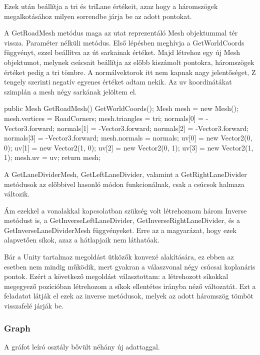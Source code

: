 Ezek után beállítja a tri és triLane értékeit, azaz hogy a háromszögek megalkotásához milyen sorrendbe járja be az adott pontokat.


A GetRoadMesh metódus maga az utat reprezentáló Mesh objektummal tér vissza. Paraméter nélküli metódus. Első lépésben meghívja a GetWorldCoords függvényt, ezzel beállítva az út sarkainak értéket. Majd létrehoz egy új Mesh objektumot, melynek csúcsait beállítja az előbb kiszámolt pontokra, háromszögek értéket pedig a tri tömbre. A normálvektorok itt nem kapnak nagy jelentőséget, Z tengely szerinti negatív egyenes értéket adtam nekik. Az uv koordinátákat szimplán a mesh négy sarkának jelöltem el.
\begin{cpp}
public Mesh GetRoadMesh()
        {
            GetWorldCoords();
            Mesh mesh = new Mesh();
            mesh.vertices = RoadCorners;
            mesh.triangles = tri;
            normals[0] = -Vector3.forward;
            normals[1] = -Vector3.forward;
            normals[2] = -Vector3.forward;
            normals[3] = -Vector3.forward;
            mesh.normals = normals;
            uv[0] = new Vector2(0, 0);
            uv[1] = new Vector2(1, 0);
            uv[2] = new Vector2(0, 1);
            uv[3] = new Vector2(1, 1);
            mesh.uv = uv;
            return mesh;
        }
\end{cpp}
A GetLaneDividerMesh, GetLeftLaneDivider, valamint a GetRightLaneDivider metódusok az előbbivel hasonló módon funkcionálnak, csak a csúcsok halmaza változik.

Ám ezekkel a vonalakkal kapcsolatban szükség volt létrehoznom három Inverse metódust is, a GetInverseLeftLaneDivider, GetInverseRightLaneDivider, és a GetInverseLaneDividerMesh függvényeket. Erre az a magyarázat, hogy ezek alapvetően síkok, azaz a hátlapjaik nem láthatóak. 

Bár a Unity tartalmaz megoldást ütközők konvexé alakítására, ez ebben az esetben nem mindig működik, mert gyakran a válaszvonal négy csúcsai koplanáris pontok. Ezért a következő megoldást választottam: a létrehozott síkokkal megegyező pozícióban létrehozom a síkok ellentétes irányba néző változatát. Ezt a feladatot látják el ezek az inverse metódusok, melyek az adott háromszög tömböt visszafelé járják be.

\subsubsection{Graph}
A gráfot leíró osztály bővült néhány új adattaggal. 

